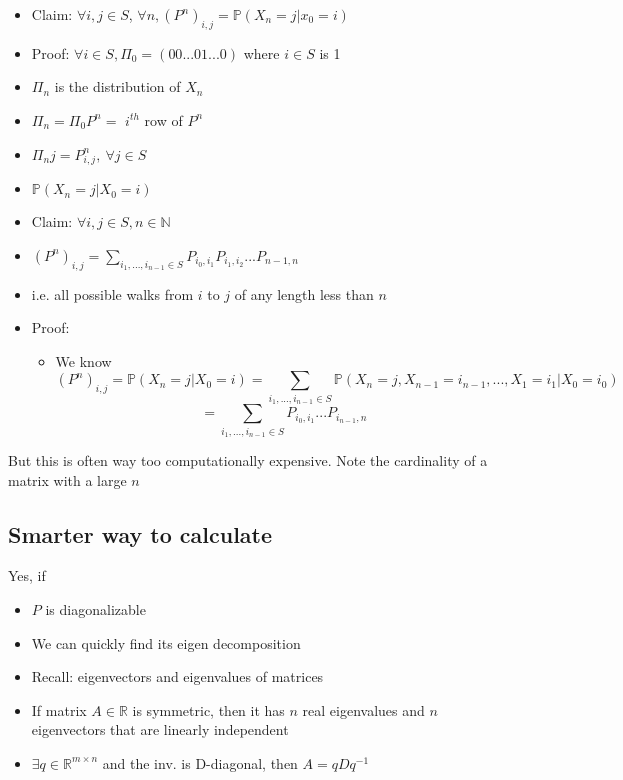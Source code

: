 \documentclass{article}
\begin{document}
\begin{itemize}
    \item Claim: $\forall i, j \in S$, $\forall n, (P^n)_{i,j}=\mathbb{P}(X_n = j | x_0 = i)$
    \item Proof: $\forall i \in S, \Pi_0 = (00...01...0)$ where $i\in S$ is 1 
    \item $\Pi_n$ is the distribution of $X_n$
    \item $\Pi_n = \Pi_0 P^n =$ $i^{th}$ row of $P^n$
    \item $\Pi_n{j}=P^n_{i,j}, \ \forall j \in S$
    \item $\mathbb{P}(X_n=j | X_0 =i)$
\end{itemize}

\begin{itemize}
    \item Claim: $\forall i,j \in S, n \in \mathbb{N}$
    \item $(P^n)_{i,j} = \sum_{i_1,...,i_{n-1} \in S}P_{i_0,i_1}P_{i_1,i_2}...P_{n-1, n}$
    \item i.e. all possible walks from $i$ to $j$ of any length less than $n$
    \item Proof: 
    \begin{itemize}
        \item We know $$(P^n)_{i,j} = \mathbb{P}(X_n=j | X_0=i)=\sum_{i_1,...,i_{n-1} \in S}\mathbb{P}(X_n=j, X_{n-1}=i_{n-1}, ... , X_1 = i_1 | X_0 = i_0)$$ 
            $$= \sum_{i_1,...,i_{n-1} \in S}P_{i_0, i_1}...P_{i_{n-1}, n}$$
    \end{itemize}
\end{itemize}

But this is often way too computationally expensive. Note the cardinality of a matrix with a large $n$

\subsection{Smarter way to calculate}

Yes, if
\begin{itemize}
    \item $P$ is diagonalizable
    \item We can quickly find its eigen decomposition
    \item Recall: eigenvectors and eigenvalues of matrices
    \item If matrix $A\in \mathbb{R}$ is symmetric, then it has $n$ real eigenvalues and $n$ eigenvectors that are linearly independent
    \item $\exists q \in \mathbb{R}^{m\times n }$ and the inv. is D-diagonal, then $A=qDq^{-1}$
\end{itemize}
\end{document}
